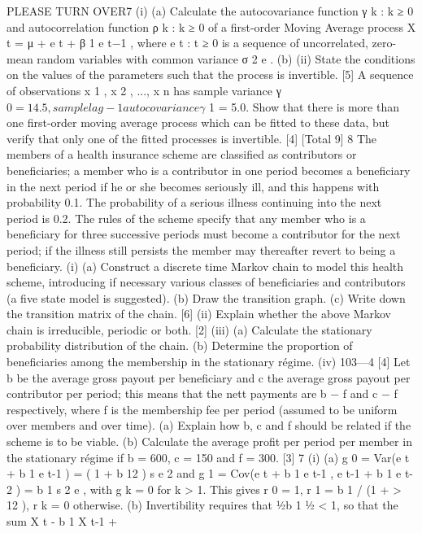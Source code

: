 \documentclass[a4paper,12pt]{article}
\begin{document}
\begin{enumerate}
PLEASE TURN OVER7
(i)
(a)
Calculate the autocovariance function {γ k : k ≥ 0} and
autocorrelation function {ρ k : k ≥ 0} of a first-order Moving
Average process
X t = μ + e t + β 1 e t−1 ,
where {e t : t ≥ 0} is a sequence of uncorrelated, zero-mean random
variables with common variance σ 2 e .
(b)
(ii)
State the conditions on the values of the parameters such that
the process is invertible.
[5]
A sequence of observations x 1 , x 2 , ..., x n has sample variance γ $ 0 = 14.5,
sample lag-1 autocovariance γ $ 1 = 5.0. Show that there is more than one
first-order moving average process which can be fitted to these data,
but verify that only one of the fitted processes is invertible.
[4]
[Total 9]
8
The members of a health insurance scheme are classified as contributors or
beneficiaries; a member who is a contributor in one period becomes a
beneficiary in the next period if he or she becomes seriously ill, and this
happens with probability 0.1. The probability of a serious illness continuing
into the next period is 0.2. The rules of the scheme specify that any member
who is a beneficiary for three successive periods must become a contributor for
the next period; if the illness still persists the member may thereafter revert
to being a beneficiary.
(i)
(a) Construct a discrete time Markov chain to model this health
scheme, introducing if necessary various classes of beneficiaries
and contributors (a five state model is suggested).
(b) Draw the transition graph.
(c) Write down the transition matrix of the chain.
[6]
(ii) Explain whether the above Markov chain is irreducible, periodic or
both.
[2]
(iii) (a)
Calculate the stationary probability distribution of the chain.
(b)
Determine the proportion of beneficiaries among the
membership in the stationary régime.
(iv)
103—4
[4]
Let b be the average gross payout per beneficiary and c the average
gross payout per contributor per period; this means that the nett
payments are b − f and c − f respectively, where f is the membership fee
per period (assumed to be uniform over members and over time).
(a) Explain how b, c and f should be related if the scheme is to be
viable.
(b) Calculate the average profit per period per member in the
stationary régime if b = 600, c = 150 and f = 300.
[3]
7
(i)
(a)
g 0 = Var(e t + b 1 e t-1 ) = ( 1 + b 12 ) s e 2 and g 1 = Cov(e t + b 1 e t-1 , e t-1 + b 1 e t-2 )
= b 1 s 2 e , with g k = 0 for k > 1.
This gives r 0 = 1, r 1 = b 1 / (1 + > 12 ), r k = 0 otherwise.
(b)
Invertibility requires that 1⁄2b 1 1⁄2 < 1, so that the sum X t - b 1 X t-1 +

\end{enumerate}
\end{document}
